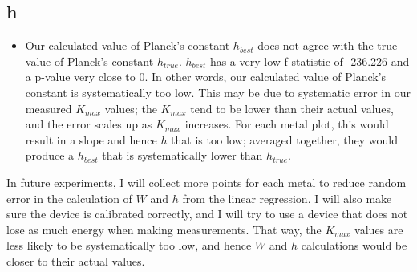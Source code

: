\documentclass{article}
\begin{document}
\subsection{h}
\begin{itemize}
  \item Our calculated value of Planck's constant $h_{best}$ does not agree with the true value of Planck's constant $h_{true}$. $h_{best}$ has a very low f-statistic of -236.226 and a p-value very close to 0. In other words, our calculated value of Planck's constant is systematically too low. This may be due to systematic error in our measured $K_{max}$ values; the $K_{max}$ tend to be lower than their actual values, and the error scales up as $K_{max}$ increases. For each metal plot, this would result in a slope and hence $h$ that is too low; averaged together, they would produce a $h_{best}$ that is systematically lower than $h_{true}$.
\end{itemize}

In future experiments, I will collect more points for each metal to reduce random error in the calculation of $W$ and $h$ from the linear regression. I will also make sure the device is calibrated correctly, and I will try to use a device that does not lose as much energy when making measurements. That way, the $K_{max}$ values are less likely to be systematically too low, and hence $W$ and $h$ calculations would be closer to their actual values.
\end{document}
